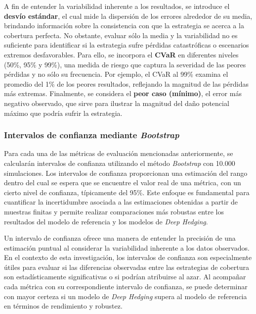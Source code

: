 \documentclass[11pt,a4paper,spanish]{article}
\numberwithin{equation}{section} %
\begin{document}
A fin de entender la variabilidad inherente a los resultados, se introduce el \textbf{desvío estándar}, el cual mide la dispersión de los errores alrededor de su media, brindando información sobre la consistencia con que la estrategia se acerca a la cobertura perfecta. No obstante, evaluar sólo la media y la variabilidad no es suficiente para identificar si la estrategia sufre pérdidas catastróficas o escenarios extremos desfavorables. Para ello, se incorpora el \textbf{CVaR} en diferentes niveles (50\%, 95\% y 99\%), una medida de riesgo que captura la severidad de las peores pérdidas y no sólo su frecuencia. Por ejemplo, el CVaR al 99\% examina el promedio del 1\% de los peores resultados, reflejando la magnitud de las pérdidas más extremas. Finalmente, se considera el \textbf{peor caso (mínimo)}, el error más negativo observado, que sirve para ilustrar la magnitud del daño potencial máximo que podría sufrir la estrategia.



\subsubsection{Intervalos de confianza mediante \textit{Bootstrap}}

Para cada una de las métricas de evaluación mencionadas anteriormente, se calcularán intervalos de confianza utilizando el método \textit{Bootstrap} con 10.000 simulaciones. Los intervalos de confianza proporcionan una estimación del rango dentro del cual se espera que se encuentre el valor real de una métrica, con un cierto nivel de confianza, típicamente del 95\%. Este enfoque es fundamental para cuantificar la incertidumbre asociada a las estimaciones obtenidas a partir de muestras finitas y permite realizar comparaciones más robustas entre los resultados del modelo de referencia y los modelos de \textit{Deep Hedging}.

Un intervalo de confianza ofrece una manera de entender la precisión de una estimación puntual al considerar la variabilidad inherente a los datos observados. En el contexto de esta investigación, los intervalos de confianza son especialmente útiles para evaluar si las diferencias observadas entre las estrategias de cobertura son estadísticamente significativas o si podrían atribuirse al azar. Al acompañar cada métrica con su correspondiente intervalo de confianza, se puede determinar con mayor certeza si un modelo de \textit{Deep Hedging} supera al modelo de referencia en términos de rendimiento y robustez.
\end{document}
